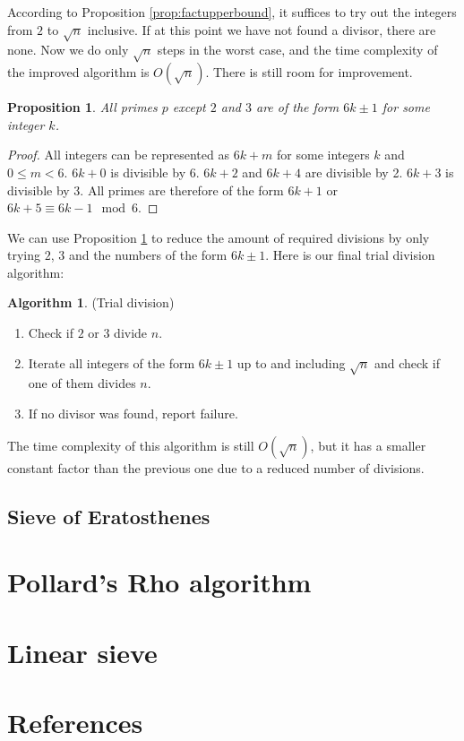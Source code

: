 \documentclass[12pt] {article}
\theoremstyle{plain}
\newtheorem{prop}[thm]{Proposition}
\theoremstyle{definition}
\newtheorem{algo}[thm]{Algorithm}
\begin{document}
According to Proposition \ref{prop:factupperbound}, it suffices to try out the integers from $2$ to $\sqrt{n}$ inclusive. If at this point we have not found a divisor, there are none. Now we do only $\sqrt{n}$ steps in the worst case, and the time complexity of the improved algorithm is $O(\sqrt{n})$. There is still room for improvement.

\begin{prop}
\label {prop:primes6pm1}
All primes $p$ except $2$ and $3$ are of the form $6k \pm 1$ for some integer $k$.
\end{prop}

\begin{proof}
All integers can be represented as $6k + m$ for some integers $k$ and $0 \leq m < 6$. $6k + 0$ is divisible by 6. $6k + 2$ and $6k + 4$ are divisible by 2. $6k + 3$ is divisible by 3. All primes are therefore of the form $6k + 1$ or $6k + 5 \equiv 6k - 1 \mod 6$.
\end{proof}

We can use Proposition \ref{prop:primes6pm1} to reduce the amount of required divisions by only trying $2$, $3$ and the numbers of the form $6k \pm 1$. Here is our final trial division algorithm:
\begin{algo} (Trial division)
\begin{enumerate}
\item Check if $2$ or $3$ divide $n$.
\item Iterate all integers of the form $6k \pm 1$ up to and including $\sqrt{n}$ and check if one of them divides $n$.
\item If no divisor was found, report failure.
\end{enumerate}
\end{algo}

The time complexity of this algorithm is still $O(\sqrt{n})$, but it has a smaller constant factor than the previous one due to a reduced number of divisions.

\subsection {Sieve of Eratosthenes}

\section {Pollard's Rho algorithm}

\section {Linear sieve}

\section {References}
\end{document}

